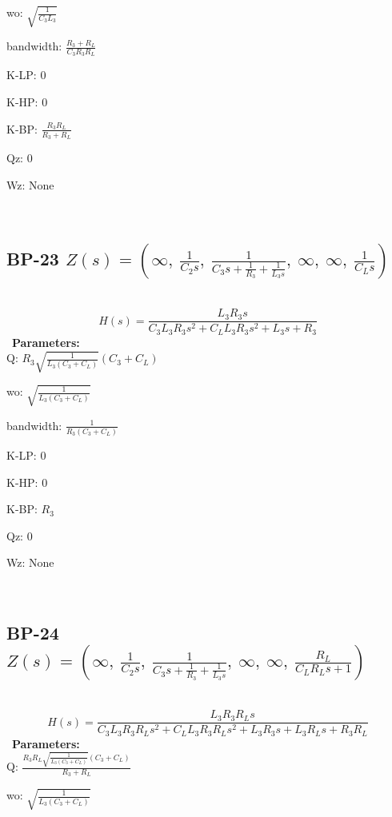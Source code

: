 \documentclass{article}
\begin{document}
wo: $\sqrt{\frac{1}{C_{3} L_{3}}}$\ 

bandwidth: $\frac{R_{3} + R_{L}}{C_{3} R_{3} R_{L}}$\ 

K-LP: $0$\ 

K-HP: $0$\ 

K-BP: $\frac{R_{3} R_{L}}{R_{3} + R_{L}}$\ 

Qz: $0$\ 

Wz: $\text{None}$\ 

\ 

\subsection{BP-23 $Z(s) = \left( \infty, \  \frac{1}{C_{2} s}, \  \frac{1}{C_{3} s + \frac{1}{R_{3}} + \frac{1}{L_{3} s}}, \  \infty, \  \infty, \  \frac{1}{C_{L} s}\right)$ } \ 
\textbf{\[H(s) = \frac{L_{3} R_{3} s}{C_{3} L_{3} R_{3} s^{2} + C_{L} L_{3} R_{3} s^{2} + L_{3} s + R_{3}}\] } \ 
\textbf{Parameters:}\\ 

Q: $R_{3} \sqrt{\frac{1}{L_{3} \left(C_{3} + C_{L}\right)}} \left(C_{3} + C_{L}\right)$\ 

wo: $\sqrt{\frac{1}{L_{3} \left(C_{3} + C_{L}\right)}}$\ 

bandwidth: $\frac{1}{R_{3} \left(C_{3} + C_{L}\right)}$\ 

K-LP: $0$\ 

K-HP: $0$\ 

K-BP: $R_{3}$\ 

Qz: $0$\ 

Wz: $\text{None}$\ 

\ 

\subsection{BP-24 $Z(s) = \left( \infty, \  \frac{1}{C_{2} s}, \  \frac{1}{C_{3} s + \frac{1}{R_{3}} + \frac{1}{L_{3} s}}, \  \infty, \  \infty, \  \frac{R_{L}}{C_{L} R_{L} s + 1}\right)$ } \ 
\textbf{\[H(s) = \frac{L_{3} R_{3} R_{L} s}{C_{3} L_{3} R_{3} R_{L} s^{2} + C_{L} L_{3} R_{3} R_{L} s^{2} + L_{3} R_{3} s + L_{3} R_{L} s + R_{3} R_{L}}\] } \ 
\textbf{Parameters:}\\ 

Q: $\frac{R_{3} R_{L} \sqrt{\frac{1}{L_{3} \left(C_{3} + C_{L}\right)}} \left(C_{3} + C_{L}\right)}{R_{3} + R_{L}}$\ 

wo: $\sqrt{\frac{1}{L_{3} \left(C_{3} + C_{L}\right)}}$\ 
\end{document}
